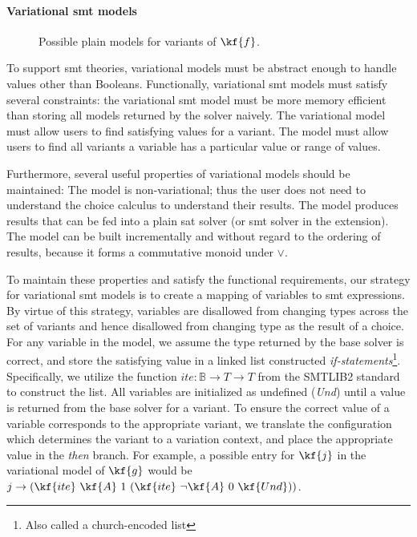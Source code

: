 %
\paragraph{Variational \ac{smt} models}
%
\begin{figure}[h]
    \centering
    
    \caption{Possible plain models for variants of $\kf{f}$. }%
    \label{fig:vsmt:models:plain}
\end{figure}
%
To support \ac{smt} theories, variational models must be abstract enough to
handle values other than Booleans. Functionally, variational \ac{smt} models
must satisfy several constraints: the variational \ac{smt} model must be more
memory efficient than storing all models returned by the solver naively. The
variational model must allow users to find satisfying values for a variant. The
model must allow users to find all variants a variable has a particular value or
range of values.

Furthermore, several useful properties of variational models should be
maintained: The model is non-variational; thus the user does not need to
understand the choice calculus to understand their results. The model produces
results that can be fed into a plain \ac{sat} solver (or \ac{smt} solver in the
extension). The model can be built incrementally and without regard to the
ordering of results, because it forms a commutative monoid under $\vee$.

To maintain these properties and satisfy the functional requirements, our
strategy for variational \ac{smt} models is to create a mapping of variables to
\ac{smt} expressions. By virtue of this strategy, variables are disallowed from
changing types across the set of variants and hence disallowed from changing
type as the result of a choice. For any variable in the model, we assume the
type returned by the base solver is correct, and store the satisfying value in a
linked list constructed \emph{if-statements}\footnote{Also called a
  church-encoded list}. Specifically, we utilize the function $ite : \mathbb{B}
\rightarrow T \rightarrow T$ from the SMTLIB2 standard to construct the list.
All variables are initialized as undefined (\emph{Und}) until a value is
returned from the base solver for a variant. To ensure the correct value of a
variable corresponds to the appropriate variant, we translate the configuration
which determines the variant to a variation context, and place the appropriate
value in the \emph{then} branch. For example, a possible entry for $\kf{j}$ in
the variational model of $\kf{g}$ would be $j \rightarrow (\kf{ite}\ \kf{A}\ 1\
(\kf{ite}\ \neg\kf{A}\ 0\ \kf{Und}))$.

